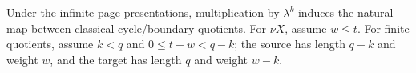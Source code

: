 \begin{proposition}
Under the infinite-page presentations, multiplication by $\lambda^k$ induces the natural map between classical cycle/boundary quotients. For $\nu X$, assume $w\le t$. For finite quotients, assume $k<q$ and $0\le t-w<q-k$; the source has length $q-k$ and weight $w$, and the target has length $q$ and weight $w-k$.

\end{proposition}
